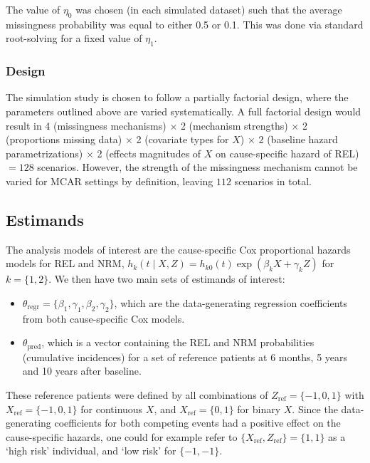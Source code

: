\documentclass[
  letterpaper,
  DIV=11,
  numbers=noendperiod]{scrreprt}
\begin{document}
The value of \(\eta_0\) was chosen (in each simulated dataset) such that
the average missingness probability was equal to either 0.5 or 0.1. This
was done via standard root-solving for a fixed value of \(\eta_1\).

\hypertarget{design}{%
\subsubsection{Design}\label{design}}

The simulation study is chosen to follow a partially factorial design,
where the parameters outlined above are varied systematically. A full
factorial design would result in 4 (missingness mechanisms) \(\times\) 2
(mechanism strengths) \(\times\) 2 (proportions missing data) \(\times\)
2 (covariate types for \(X\)) \(\times\) 2 (baseline hazard
parametrizations) \(\times\) 2 (effects magnitudes of \(X\) on
cause-specific hazard of REL) \(= 128\) scenarios. However, the strength
of the missingness mechanism cannot be varied for MCAR settings by
definition, leaving \(112\) scenarios in total.

\hypertarget{estimands}{%
\subsection{Estimands}\label{estimands}}

The analysis models of interest are the cause-specific Cox proportional
hazards models for REL and NRM,
\(h_k(t \mid X, Z) = h_{k0}(t)\exp(\beta_k X + \gamma_k Z)\) for
\(k = \{1,2\}\). We then have two main sets of estimands of interest:

\begin{itemize}
\item
  \(\theta_{\text{regr}} = \{\beta_1,\gamma_1,\beta_2,\gamma_2\}\),
  which are the data-generating regression coefficients from both
  cause-specific Cox models.
\item
  \(\theta_{\text{pred}}\), which is a vector containing the REL and NRM
  probabilities (cumulative incidences) for a set of reference patients
  at 6 months, 5 years and 10 years after baseline.
\end{itemize}

These reference patients were defined by all combinations of
\(Z_{\text{ref}} = \{-1,0,1\}\) with \(X_{\text{ref}} = \{-1,0,1\}\) for
continuous \(X\), and \(X_{\text{ref}} = \{0,1\}\) for binary \(X\).
Since the data-generating coefficients for both competing events had a
positive effect on the cause-specific hazards, one could for example
refer to \(\{X_{\text{ref}},Z_{\text{ref}}\} = \{1, 1\}\) as a `high
risk' individual, and `low risk' for \(\{-1, -1\}\).
\end{document}
